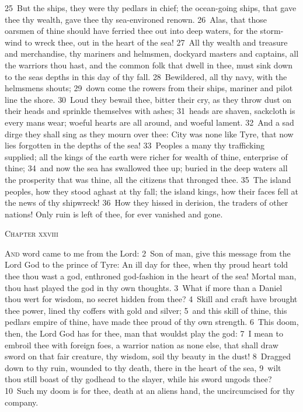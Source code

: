 \documentclass[10pt]{book} %
\begin{document}
\textcolor{benred8}{25}~But the ships, they were thy pedlars in chief; the ocean-going ships, that gave thee thy wealth, gave thee thy sea-environed renown. \textcolor{benred8}{26}~Alas, that those oarsmen of thine should have ferried thee out into deep waters, for the storm-wind to wreck thee, out in the heart of the sea! \textcolor{benred8}{27}~All thy wealth and treasure and merchandise, thy mariners and helmsmen, dockyard masters and captains, all the warriors thou hast, and the common folk that dwell in thee, must sink down to the sea\textquotesingle s depths in this day of thy fall. \textcolor{benred8}{28}~Bewildered, all thy navy, with the helmsmen\textquotesingle s shouts; \textcolor{benred8}{29}~down come the rowers from their ships, mariner and pilot line the shore. \textcolor{benred8}{30}~Loud they bewail thee, bitter their cry, as they throw dust on their heads and sprinkle themselves with ashes; \textcolor{benred8}{31}~heads are shaven, sackcloth is every man\textquotesingle s wear; woeful hearts are all around, and woeful lament. \textcolor{benred8}{32}~And a sad dirge they shall sing as they mourn over thee: City was none like Tyre, that now lies forgotten in the depths of the sea! \textcolor{benred8}{33}~Peoples a many thy trafficking supplied; all the kings of the earth were richer for wealth of thine, enterprise of thine; \textcolor{benred8}{34}~and now the sea has swallowed thee up; buried in the deep waters all the prosperity that was thine, all the citizens that thronged thee. \textcolor{benred8}{35}~The island peoples, how they stood aghast at thy fall; the island kings, how their faces fell at the news of thy shipwreck! \textcolor{benred8}{36}~How they hissed in derision, the traders of other nations! Only ruin is left of thee, for ever vanished and gone.
\begin{large}\begin{center}\textsc{Chapter xxviii}\end{center}\end{large}
\lettrine[lines=2]{A}{nd} word came to me from the Lord: \textcolor{benred8}{2}~Son of man, give this message from the Lord God to the prince of Tyre: An ill day for thee, when thy proud heart told thee thou wast a god, enthroned god-fashion in the heart of the sea! Mortal man, thou hast played the god in thy own thoughts. \textcolor{benred8}{3}~What if more than a Daniel thou wert for wisdom, no secret hidden from thee? \textcolor{benred8}{4}~Skill and craft have brought thee power, lined thy coffers with gold and silver; \textcolor{benred8}{5}~and this skill of thine, this pedlar\textquotesingle s empire of thine, have made thee proud of thy own strength. \textcolor{benred8}{6}~This doom, then, the Lord God has for thee, man that wouldst play the god: \textcolor{benred8}{7}~I mean to embroil thee with foreign foes, a warrior nation as none else, that shall draw sword on that fair creature, thy wisdom, soil thy beauty in the dust! \textcolor{benred8}{8}~Dragged down to thy ruin, wounded to thy death, there in the heart of the sea, \textcolor{benred8}{9}~wilt thou still boast of thy godhead to the slayer, while his sword ungods thee? \textcolor{benred8}{10}~Such my doom is for thee, death at an alien\textquotesingle s hand, the uncircumcised for thy company.
\end{document}
